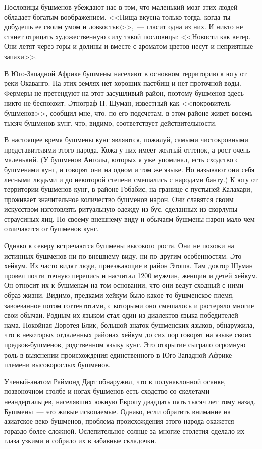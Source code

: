 \documentclass[12pt,a4paper,twoside,openany,svgnames]{memoir}
\begin{document}
Пословицы бушменов убеждают нас в том, что маленький мозг этих людей обладает богатым воображением. <<Пища вкусна только тогда, когда ты добудешь ее своим умом и ловкостью>>,~--- гласит одна из них. И никто не станет отрицать художественную силу такой пословицы: <<Новости как ветер. Они летят через горы и долины и вместе с ароматом цветов несут и неприятные запахи>>.

В Юго-Западной Африке бушмены населяют в основном территорию к югу от реки Окаванго. На этих землях нет хороших пастбищ и нет проточной воды. Фермеры не претендуют на этот засушливый район, поэтому бушменов здесь никто не беспокоит. Этнограф П. Шуман, известный как <<покровитель бушменов>>, сообщил мне, что, по его подсчетам, в этом районе живет восемь тысяч бушменов кунг, что, видимо, соответствует действительности.

В настоящее время бушмены кунг являются, пожалуй, самыми чистокровными представителями этого народа. Кожа у них имеет желтый оттенок, а рост очень маленький. (У бушменов Анголы, которых я уже упоминал, есть сходство с бушменами кунг, и говорят они на одном и том же языке. Но называют они себя лесными людьми и до некоторой степени смешались с народами банту.) К югу от территории бушменов кунг, в районе Гобабис, на границе с пустыней Калахари, проживает значительное количество бушменов нарон. Они славятся своим искусством изготовлять ритуальную одежду из бус, сделанных из скорлупы страусиных яиц. По своему внешнему виду и обычаям бушмены нарон мало чем отличаются от бушменов кунг.

Однако к северу встречаются бушмены высокого роста. Они не похожи на истинных бушменов ни по внешнему виду, ни по другим особенностям. Это хейкум. Их часто видят люди, приезжающие в район Этоша. Там доктор Шуман провел почти точную перепись и насчитал 1200 мужчин, женщин и детей хейкум. Он относит их к бушменам на том основании, что они ведут сходный с ними образ жизни. Видимо, предками хейкум было какое-то бушменское племя, завоеванное потом готтентотами, с которыми оно смешалось и растеряло многие свои обычаи. Родным их языком стал один из диалектов языка победителей~--- нама. Покойная Доротея Блик, большой знаток бушменских языков, обнаружила, что в некоторых отдаленных районах хейкум до сих пор говорят на языке своих предков-бушменов, родственном языку кунг. Это открытие сыграло огромную роль в выяснении происхождения единственного в Юго-Западной Африке племени высокорослых бушменов.

Ученый-анатом Раймонд Дарт обнаружил, что в полунаклонной осанке, позвоночном столбе и ногах бушменов есть сходство со скелетами неандертальцев, населявших южную Европу двадцать пять тысяч лет тому назад. Бушмены~--- это живые ископаемые. Однако, если обратить внимание на азиатское веко бушменов, проблема происхождения этого народа окажется гораздо более сложной. Ослепительное солнце за многие столетия сделало их глаза узкими и собрало их в забавные складочки.
\end{document}
